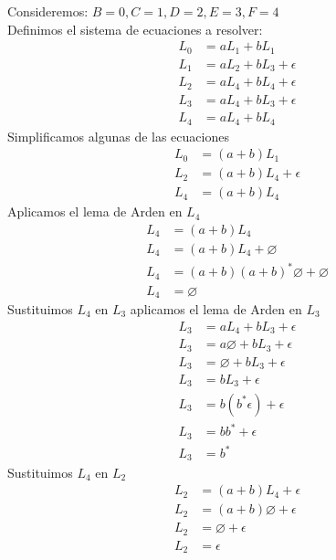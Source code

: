 \documentclass{article}
\begin{document}
\begin{enumerate}
{\begin{enumerate}
{    			Consideremos: $B = 0, C = 1, D = 2, E = 3, F= 4$\\ Definimos el sistema de ecuaciones a resolver:\\
    			\begin{align*}
    				L_{0} &= aL_{1} + bL_{1}\\
    				L_{1} &= aL_{2} + bL_{3} + \epsilon\\
    				L_{2} &= aL_{4} + bL_{4} + \epsilon\\
    				L_{3} &= aL_{4} + bL_{3} + \epsilon\\
    				L_{4} &= aL_{4} + bL_{4}
    			\end{align*}
    			Simplificamos algunas de las ecuaciones
    			\begin{align*}
    				L_{0} &= (a+b)L_{1}\\
    				L_{2} &= (a+b)L_{4} + \epsilon\\
    				L_{4} &= (a+b)L_{4}
    			\end{align*}
    			Aplicamos el lema de Arden en $L_{4}$
    			\begin{align*}
					L_{4} &= (a+b)L_{4}\\
					L_{4} &= (a+b)L_{4} + \varnothing \\
					L_{4} &= (a+b)(a+b)^*\varnothing + \varnothing \\
					L_{4} &= \varnothing
    			\end{align*}
    			Sustituimos $L_{4}$ en $L_{3}$ aplicamos el lema de Arden en $L_{3}$
    			\begin{align*}
    				L_{3} &= aL_{4} + bL_{3} + \epsilon\\
					L_{3} &= a\varnothing + bL_{3} + \epsilon\\
					L_{3} &= \varnothing + bL_{3} + \epsilon\\
					L_{3} &= bL_{3} + \epsilon\\
					L_{3} &= b(b^*\epsilon) + \epsilon\\
					L_{3} &= bb^* + \epsilon\\
					L_{3} &= b^*
    			\end{align*}
    			Sustituimos $L_{4}$ en $L_{2}$
    			\begin{align*}
    				L_{2} &= (a+b)L_{4} + \epsilon\\
    				L_{2} &= (a+b)\varnothing + \epsilon\\
    				L_{2} &= \varnothing + \epsilon \\
    				L_{2} &= \epsilon
    			\end{align*}
}
\end{enumerate}}
\end{enumerate}
\end{document}
